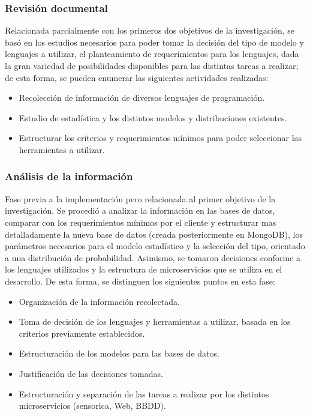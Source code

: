 \subsubsection{Revisión documental}
Relacionada parcialmente con los primeros dos objetivos de la investigación,
se basó en los estudios necesarios para poder tomar la decisión del tipo de modelo
y lenguajes a utilizar, el planteamiento de requerimientos para los
lenguajes, dada la gran variedad de posibilidades disponibles para las distintas
tareas a realizar; de esta forma, se pueden enumerar las siguientes actividades
realizadas:

\begin{itemize}
    \item Recolección de información de diversos lenguajes de programación.
    \item Estudio de estadística y los distintos modelos y distribuciones existentes.
    \item Estructurar los criterios y requerimientos mínimos para poder seleccionar
        las herramientas a utilizar.
\end{itemize}

\subsubsection{Análisis de la información}
Fase previa a la implementación pero relacionada al primer objetivo
de la investigación. Se procedió a analizar la información en las bases de datos,
comparar con los requerimientos mínimos por el cliente y estructurar mas detalladamente
la nueva base de datos (creada posteriormente en MongoDB), los parámetros
necesarios para el modelo estadístico y la selección del tipo, orientado a una
distribución de probabilidad. Asimismo, se tomaron decisiones conforme a los
lenguajes utilizados y la estructura de microservicios que se utiliza en el
desarrollo. De esta forma, se distinguen los siguientes puntos en esta fase:

\begin{itemize}
    \item Organización de la información recolectada.
    \item Toma de decisión de los lenguajes y herramientas a utilizar, basada
        en los criterios previamente establecidos.
    \item Estructuración de los modelos para las bases de datos.
    \item Justificación de las decisiones tomadas.
    \item Estructuración y separación de las tareas a realizar por los distintos
        microservicios (sensorica, Web, BBDD).
\end{itemize}

